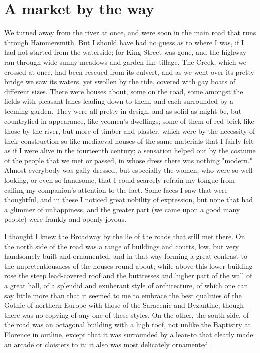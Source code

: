 \chapter{A market by the way}

We turned away from the river at once, and were soon in the main road
that runs through Hammersmith. But I should have had no guess as to
where I was, if I had not started from the waterside; for King Street
was gone, and the highway ran through wide sunny meadows and garden-like
tillage. The Creek, which we crossed at once, had been rescued from its
culvert, and as we went over its pretty bridge we saw its waters, yet
swollen by the tide, covered with gay boats of different sizes. There
were houses about, some on the road, some amongst the fields with
pleasant lanes leading down to them, and each surrounded by a teeming
garden. They were all pretty in design, and as solid as might be, but
countryfied in appearance, like yeomen's dwellings; some of them of red
brick like those by the river, but more of timber and plaster, which
were by the necessity of their construction so like mediaeval houses of
the same materials that I fairly felt as if I were alive in the
fourteenth century; a sensation helped out by the costume of the people
that we met or passed, in whose dress there was nothing "modern." Almost
everybody was gaily dressed, but especially the women, who were so
well-looking, or even so handsome, that I could scarcely refrain my
tongue from calling my companion's attention to the fact. Some faces I
saw that were thoughtful, and in these I noticed great nobility of
expression, but none that had a glimmer of unhappiness, and the greater
part (we came upon a good many people) were frankly and openly joyous.

I thought I knew the Broadway by the lie of the roads that still met
there. On the north side of the road was a range of buildings and
courts, low, but very handsomely built and ornamented, and in that way
forming a great contrast to the unpretentiousness of the houses round
about; while above this lower building rose the steep lead-covered roof
and the buttresses and higher part of the wall of a great hall, of a
splendid and exuberant style of architecture, of which one can say
little more than that it seemed to me to embrace the best qualities of
the Gothic of northern Europe with those of the Saracenic and Byzantine,
though there was no copying of any one of these styles. On the other,
the south side, of the road was an octagonal building with a high roof,
not unlike the Baptistry at Florence in outline, except that it was
surrounded by a lean-to that clearly made an arcade or cloisters to it:
it also was most delicately ornamented.

